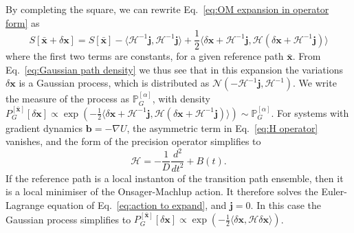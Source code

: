 By completing the square, we can rewrite Eq.~\ref{eq:OM expansion in operator form} as
\begin{equation}
	S[\bar{\mathbf{x}} + \delta \mathbf{x}] = S[\bar{\mathbf{x}}]
		- \langle \mathcal{H}^{-1} \mathbf{j}, \mathcal{H}^{-1} \mathbf{j} \rangle + \frac{1}{2} \langle \delta \mathbf{x}
		+ \mathcal{H}^{-1} \mathbf{j}, \mathcal{H} (\delta \mathbf{x} + \mathcal{H}^{-1} \mathbf{j}) \rangle
\end{equation}
where the first two terms are constants, for a given reference path $\bar{\mathbf{x}}$. From Eq.~\ref{eq:Gaussian path density} we thus see that in this expansion the variations $\delta \mathbf{x}$ is a Gaussian process, which is distributed as $\mathcal{N}(-\mathcal{H}^{-1}\mathbf{j},\mathcal{H}^{-1})$. We write the measure of the process as $\mathbb{P}^{[\alpha]}_G$, with density $P_G^{[\bar{\mathbf{x}}]}[\delta\mathbf{x}]\propto\exp(-\frac{1}{2}\langle\delta\mathbf{x}+\mathcal{H}^{-1}\mathbf{j},\mathcal{H}(\delta\mathbf{x}+\mathcal{H}^{-1}\mathbf{j})\rangle) \sim \mathbb{P}_G^{[\alpha]}$. For systems with gradient dynamics $\mathbf{b}=-\nabla U$, the asymmetric term in Eq.~\ref{eq:H operator} vanishes, and the form of the precision operator simplifies to 
\begin{equation}
\mathcal{\mathcal{H}}=-\frac{1}{D}\frac{d^{2}}{dt^{2}}+B(t). 
\end{equation}
If the reference path is a local instanton of the transition path ensemble, then it is a local minimiser of the Onsager-Machlup action. It therefore solves the Euler-Lagrange equation of Eq.~\ref{eq:action to expand}, and $\mathbf{j}=0$. In this case the Gaussian process simplifies to $P_G^{[\bar{\mathbf{x}}]}[\delta\mathbf{x}]\propto\exp(-\frac{1}{2}\langle\delta\mathbf{x},\mathcal{\mathcal{\mathcal{H}}}\delta\mathbf{x} \rangle)$.

